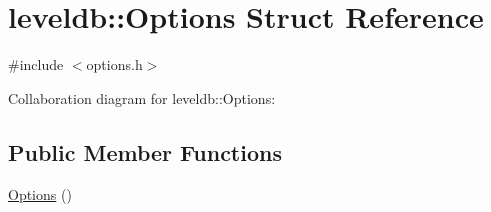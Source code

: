 \hypertarget{structleveldb_1_1_options}{}\section{leveldb\+:\+:Options Struct Reference}
\label{structleveldb_1_1_options}


{\ttfamily \#include $<$options.\+h$>$}



Collaboration diagram for leveldb\+:\+:Options\+:
\subsection*{Public Member Functions}
\begin{DoxyCompactItemize}
\item 
\hyperlink{structleveldb_1_1_options_a52d77c894795ba83077045daeab3d581}{Options} ()
\end{DoxyCompactItemize}

